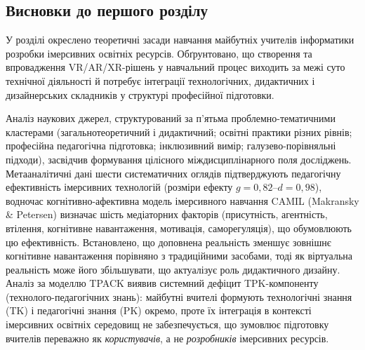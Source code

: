 \subsection*{Висновки до першого розділу}

У розділі окреслено теоретичні засади навчання майбутніх учителів інформатики розробки імерсивних освітніх ресурсів. Обґрунтовано, що створення та впровадження VR/AR/XR-рішень у навчальний процес виходить за межі суто технічної діяльності й потребує інтеграції технологічних, дидактичних і дизайнерських складників у структурі професійної підготовки.

Аналіз наукових джерел, структурований за п'ятьма проблемно-тематичними кластерами (загальнотеоретичний і дидактичний; освітні практики різних рівнів; професійна педагогічна підготовка; інклюзивний вимір; галузево-порівняльні підходи), засвідчив формування цілісного міждисциплінарного поля досліджень. Метааналітичні дані шести систематичних оглядів підтверджують педагогічну ефективність імерсивних технологій (розміри ефекту $g=0{,}82$--$d=0{,}98$), водночас когнітивно-афективна модель імерсивного навчання CAMIL (Makransky \& Petersen) визначає шість медіаторних факторів (присутність, агентність, втілення, когнітивне навантаження, мотивація, саморегуляція), що обумовлюють цю ефективність. Встановлено, що доповнена реальність зменшує зовнішнє когнітивне навантаження порівняно з традиційними засобами, тоді як віртуальна реальність може його збільшувати, що актуалізує роль дидактичного дизайну. Аналіз за моделлю TPACK виявив системний дефіцит TPK-компоненту (технолого-педагогічних знань): майбутні вчителі формують технологічні знання (TK) і педагогічні знання (PK) окремо, проте їх інтеграція в контексті імерсивних освітніх середовищ не забезпечується, що зумовлює підготовку вчителів переважно як \emph{користувачів}, а не \emph{розробників} імерсивних ресурсів.

